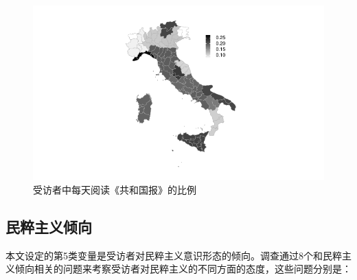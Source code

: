 \documentclass[12pt,a4paper]{ctexart}
\begin{document}
    \begin{figure}
        \centering
        \includegraphics[width=1\textwidth]{figure//unnamed-chunk-5-1.pdf}
        \caption{受访者中每天阅读《共和国报》的比例}
        \label{rep_percent}
    \end{figure}


    \subsection{民粹主义倾向}

    本文设定的第5类变量是受访者对民粹主义意识形态的倾向。调查通过8个和民粹主义倾向相关的问题来考察受访者对民粹主义的不同方面的态度，这些问题分别是：
\end{document}
